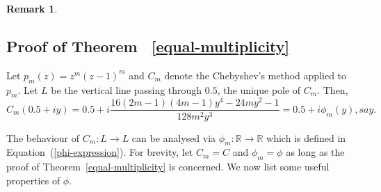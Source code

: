 \documentclass[12pt]{article}
\newtheorem{rem}{Remark}[section]
\begin{document}
\begin{rem}
%
%
\end{rem}
\subsection{Proof of Theorem ~\ref{equal-multiplicity}}
Let $p_m (z)=z^m (z-1)^m$ and $C_m $ denote the Chebyshev's method applied to $p_{m}$.  
Let $L$ be the vertical line passing through $0.5$, the unique pole of $C_m$. Then,  \begin{equation}
	C_m (0.5 +iy)= 0.5 + i\frac{16 (2m -1)(4m -1)y^4 -24 m y^2 -1}{128 m^2 y^3}=0.5+i\phi_{m}(y), say. 
	\label{phi-expression}\end{equation} 

The behaviour of $C_m : L \to L$ can be analysed via  $\phi_m: \mathbb{R} \to \mathbb{R}$ which is defined in Equation~(\ref{phi-expression}). For brevity, let $C_m =C$ and $\phi_{m} =\phi$ as long as the proof of Theorem~\ref{equal-multiplicity} is concerned. We now list some useful properties of $\phi$.
\end{document}
